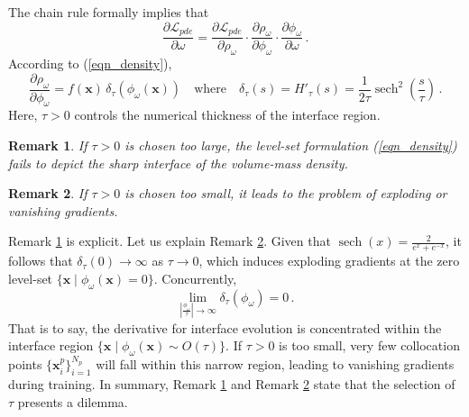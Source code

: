 \documentclass[final,hidelinks,onefignum,onetabnum]{siamart251216}
\newtheorem{remark}{Remark}
\begin{document}
The chain rule formally implies that
\begin{equation} \label{eqn3.15}
\frac{\partial\mathcal{L}_{pde}}{\partial\omega}=\frac{\partial\mathcal{L}_{pde}}{\partial\rho_\omega}\cdot \frac{\partial\rho_\omega}{\partial\phi_\omega} \cdot\frac{\partial\phi_\omega}{\partial\omega}\,.
\end{equation}
According to (\ref{eqn_density}),
\begin{equation} \label{eqn3.16}
\frac{\partial\rho_\omega}{\partial\phi_\omega}=f(\mathbf{x})\,\delta_\tau(\phi_\omega(\mathbf{x}))\quad \mathrm{where}\quad \delta_\tau(s)=H'_\tau(s)=\frac{1}{2\tau}\operatorname{sech}^2\left(\frac{s}{\tau}\right)\,.
\end{equation}
Here, $\tau>0$ controls the numerical thickness of the interface region. 
\begin{remark} \label{prop1}
If $\tau>0$ is chosen too large, the level-set formulation (\ref{eqn_density}) fails to depict the sharp interface of the volume-mass density.
\end{remark}
\begin{remark} \label{prop2}
If $\tau>0$ is chosen too small, it leads to the problem of exploding or vanishing gradients.
\end{remark}
\noindent Remark \ref{prop1} is explicit. Let us explain Remark \ref{prop2}. Given that $\operatorname{sech}(x)=\frac{2}{e^x+e^{-x}}$, it follows that $\delta_\tau(0)\to\infty$ as $\tau\to0$, which induces exploding gradients at the zero level-set $\{\mathbf{x}\mid \phi_\omega(\mathbf{x})=0\}$. Concurrently,
\begin{equation} \label{eqn3.17}
\operatorname{lim}_{|\frac{\phi_\omega}{\tau}|\to\infty} \delta_\tau(\phi_\omega)=0\,.
\end{equation}
That is to say, the derivative for interface evolution is concentrated within the interface region $\{\mathbf{x}\mid\phi_\omega(\mathbf{x})\sim O(\tau) \}$. If $\tau>0$ is too small, very few collocation points $\big\{\mathbf{x}_i^p\big\}_{i=1}^{N_p}$ will fall within this narrow region, leading to vanishing gradients during training. In summary, Remark \ref{prop1} and Remark \ref{prop2} state that the selection of $\tau$ presents a dilemma.
\end{document}
